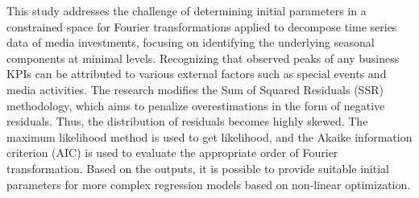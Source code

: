 
\begin{Abstrakt}
    This study addresses the challenge of determining initial parameters in a constrained space for Fourier transformations applied to decompose time series data of media investments, focusing on identifying the underlying seasonal components at minimal levels. Recognizing that observed peaks of any business KPIs can be attributed to various external factors such as special events and media activities. The research modifies the Sum of Squared Residuals (SSR) methodology, which aims to penalize overestimations in the form of negative residuals. Thus, the distribution of residuals becomes highly skewed. The maximum likelihood method is used to get likelihood, and the Akaike information criterion (AIC) is used to evaluate the appropriate order of Fourier transformation. Based on the outputs, it is possible to provide suitable initial parameters for more complex regression models based on non-linear optimization.
\end{Abstrakt}



\clearpage